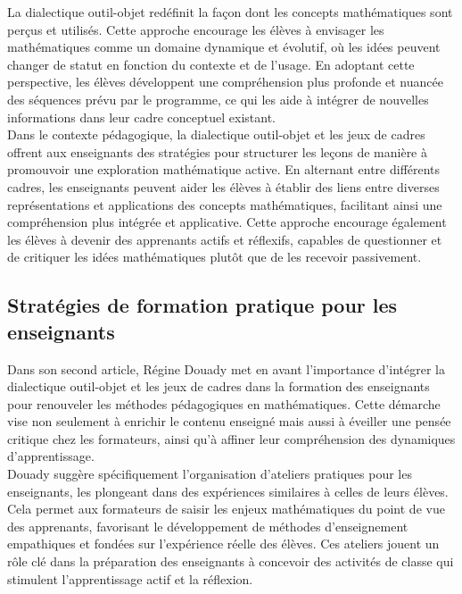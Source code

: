 La dialectique outil-objet redéfinit la façon dont les concepts mathématiques sont perçus et utilisés.
Cette approche encourage les élèves à envisager les mathématiques comme un domaine dynamique et évolutif,
où les idées peuvent changer de statut en fonction du contexte et de l'usage.
En adoptant cette perspective,
les élèves développent une compréhension plus profonde et nuancée des séquences prévu par le programme,
ce qui les aide à intégrer de nouvelles informations dans leur cadre conceptuel existant.\\

Dans le contexte pédagogique,
la dialectique outil-objet et les jeux de cadres offrent aux enseignants des stratégies pour structurer les leçons de manière à promouvoir une exploration mathématique active.
En alternant entre différents cadres,
les enseignants peuvent aider les élèves à établir des liens entre diverses représentations et applications des concepts mathématiques,
facilitant ainsi une compréhension plus intégrée et applicative.
Cette approche encourage également les élèves à devenir des apprenants actifs et réflexifs,
capables de questionner et de critiquer les idées mathématiques plutôt que de les recevoir passivement.

\subsection{Stratégies de formation pratique pour les enseignants}

Dans son second article,
Régine Douady met en avant l'importance d'intégrer la dialectique outil-objet et les jeux de cadres dans la formation des enseignants pour renouveler les méthodes pédagogiques en mathématiques.
Cette démarche vise non seulement à enrichir le contenu enseigné mais aussi à éveiller une pensée critique chez les formateurs,
ainsi qu'à affiner leur compréhension des dynamiques d'apprentissage.\\

Douady suggère spécifiquement l'organisation d'ateliers pratiques pour les enseignants,
les plongeant dans des expériences similaires à celles de leurs élèves.
Cela permet aux formateurs de saisir les enjeux mathématiques du point de vue des apprenants,
favorisant le développement de méthodes d'enseignement empathiques et fondées sur l'expérience réelle des élèves.
Ces ateliers jouent un rôle clé dans la préparation des enseignants à concevoir des activités de classe qui stimulent l'apprentissage actif et la réflexion.\\

